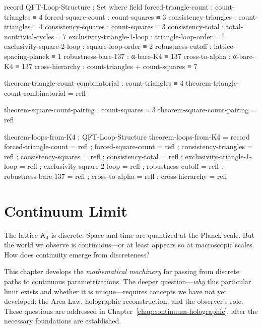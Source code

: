 \documentclass[11pt,a4paper]{book}
\begin{document}
\begin{code}
record QFT-Loop-Structure : Set where
  field
    forced-triangle-count : count-triangles ≡ 4
    forced-square-count : count-squares ≡ 3
    consistency-triangles : count-triangles ≡ 4
    consistency-squares : count-squares ≡ 3
    consistency-total : total-nontrivial-cycles ≡ 7
    exclusivity-triangle-1-loop : triangle-loop-order ≡ 1
    exclusivity-square-2-loop : square-loop-order ≡ 2
    robustness-cutoff : lattice-spacing-planck ≡ 1
    robustness-bare-137 : α-bare-K4 ≡ 137
    cross-to-alpha : α-bare-K4 ≡ 137
    cross-hierarchy : count-triangles + count-squares ≡ 7

theorem-triangle-count-combinatorial : count-triangles ≡ 4
theorem-triangle-count-combinatorial = refl

theorem-square-count-pairing : count-squares ≡ 3
theorem-square-count-pairing = refl

theorem-loops-from-K4 : QFT-Loop-Structure
theorem-loops-from-K4 = record
  { forced-triangle-count = refl
  ; forced-square-count = refl
  ; consistency-triangles = refl
  ; consistency-squares = refl
  ; consistency-total = refl
  ; exclusivity-triangle-1-loop = refl
  ; exclusivity-square-2-loop = refl
  ; robustness-cutoff = refl
  ; robustness-bare-137 = refl
  ; cross-to-alpha = refl
  ; cross-hierarchy = refl
  }

\end{code}

\chapter{Continuum Limit}
\label{chap:continuum-limit}

The lattice $K_4$ is discrete. Space and time are quantized at the Planck scale. But the 
world we observe is continuous—or at least appears so at macroscopic scales. How does 
continuity emerge from discreteness?

This chapter develops the \emph{mathematical machinery} for passing from discrete paths 
to continuous parametrizations. The deeper question—\emph{why} this particular limit 
exists and whether it is unique—requires concepts we have not yet developed: the Area Law, 
holographic reconstruction, and the observer's role. These questions are addressed in 
Chapter~\ref{chap:continuum-holographic}, after the necessary foundations are established.
\end{document}

